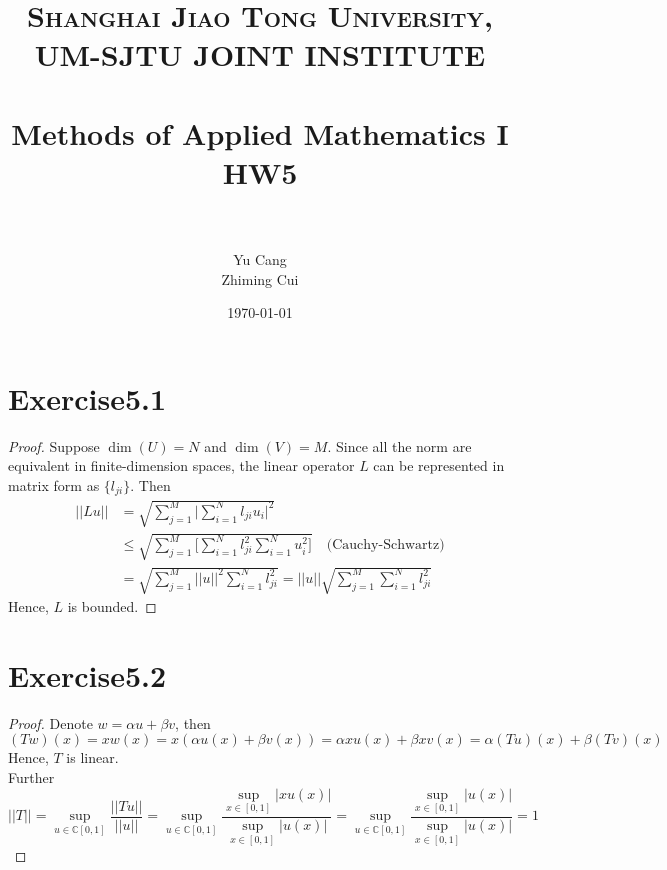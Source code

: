 \documentclass[paper=a4, fontsize=11pt]{scrartcl} %
\title{	
\normalfont \normalsize 
\textsc{Shanghai Jiao Tong University, UM-SJTU JOINT INSTITUTE} \\ [25pt] %
\horrule{0.5pt} \\[0.4cm] %
\huge Methods of Applied Mathematics I\\ HW5 \\ %
\horrule{2pt} \\[0.5cm] %
}
\author{Yu Cang \quad 018370210001\\ Zhiming Cui \quad 017370910006} %
\date{\normalsize \today} %
\numberwithin{equation}{section} %
\numberwithin{figure}{section} %
\numberwithin{table}{section} %
\begin{document}
\maketitle %

\section{Exercise5.1}
	\begin{proof}
		Suppose $\dim(U) = N$ and $\dim(V)=M$. Since all the norm are equivalent in finite-dimension spaces, the linear operator $L$ can be represented in matrix form as $\{l_{ji}\}$. Then
		\begin{equation}
			\begin{aligned}
				||Lu|| & = \sqrt{\sum_{j=1}^{M}\Big|\sum_{i=1}^{N}l_{ji} u_i\Big|^2}\\
					   & \leq \sqrt{\sum_{j=1}^{M} \Big[\sum_{i=1}^{N} l_{ji}^2 \sum_{i=1}^{N} u_{i}^2\Big]} \quad \text{(Cauchy-Schwartz)}\\
					   & = \sqrt{\sum_{j=1}^{M} ||u||^2\sum_{i=1}^{N} l_{ji}^2}
					    = ||u||\sqrt{\sum_{j=1}^{M}\sum_{i=1}^{N} l_{ji}^2}
			\end{aligned}
		\end{equation}
		Hence, $L$ is bounded.
	\end{proof}

\section{Exercise5.2}
	\begin{proof}
		Denote $w = \alpha u + \beta v$, then
		\begin{equation}
			(Tw)(x) = xw(x) = x(\alpha u(x) + \beta v(x)) = \alpha xu(x) + \beta xv(x) = \alpha (Tu)(x) + \beta (Tv)(x)
		\end{equation}
		Hence, $T$ is linear.\\ Further
		\begin{equation}
			||T|| = \sup_{u\in\mathbb{C}[0, 1]}\frac{||Tu||}{||u||} = \sup_{u\in\mathbb{C}[0, 1]} \frac{\sup_{x\in[0, 1]}|xu(x)|}{\sup_{x\in[0, 1]}|u(x)|} = \sup_{u\in\mathbb{C}[0, 1]} \frac{\sup_{x\in[0, 1]}|u(x)|}{\sup_{x\in[0, 1]}|u(x)|} = 1
		\end{equation}
	\end{proof}
\end{document}
